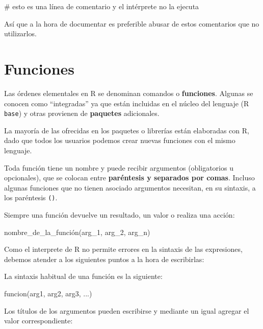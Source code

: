 \documentclass[
  spanish,
  a4paper,
]{scrbook}
\newenvironment{Shaded}{\begin{snugshade}}{\end{snugshade}}
\newcommand{\CommentTok}[1]{\textcolor[rgb]{0.37,0.37,0.37}{#1}}
\newcommand{\FunctionTok}[1]{\textcolor[rgb]{0.28,0.35,0.67}{#1}}
\newcommand{\NormalTok}[1]{\textcolor[rgb]{0.00,0.23,0.31}{#1}}
\begin{document}
\begin{Shaded}
\begin{Highlighting}[]
\CommentTok{\# esto es una línea de comentario y el intérprete no la ejecuta}
\end{Highlighting}
\end{Shaded}

Así que a la hora de documentar es preferible abusar de estos
comentarios que no utilizarlos.

\section{Funciones}\label{funciones}

Las órdenes elementales en R se denominan comandos o \textbf{funciones}.
Algunas se conocen como ``integradas'' ya que están incluidas en el
núcleo del lenguaje (R \texttt{base}) y otras provienen de
\textbf{paquetes} adicionales.

La mayoría de las ofrecidas en los paquetes o librerías están elaboradas
con R, dado que todos los usuarios podemos crear nuevas funciones con el
mismo lenguaje.

Toda función tiene un nombre y puede recibir argumentos (obligatorios u
opcionales), que se colocan entre \textbf{paréntesis y separados por
comas}. Incluso algunas funciones que no tienen asociado argumentos
necesitan, en su sintaxis, a los paréntesis \texttt{()}.

Siempre una función devuelve un resultado, un valor o realiza una
acción:

\begin{Shaded}
\begin{Highlighting}[]
\NormalTok{nombre\_de\_la\_función(arg\_1, arg\_2, arg\_n)}
\end{Highlighting}
\end{Shaded}

Como el interprete de R no permite errores en la sintaxis de las
expresiones, debemos atender a los siguientes puntos a la hora de
escribirlas:

La sintaxis habitual de una función es la siguiente:

\begin{Shaded}
\begin{Highlighting}[]
\FunctionTok{funcion}\NormalTok{(arg1, arg2, arg3, ...)}
\end{Highlighting}
\end{Shaded}

Los títulos de los argumentos pueden escribirse y mediante un igual
agregar el valor correspondiente:
\end{document}
